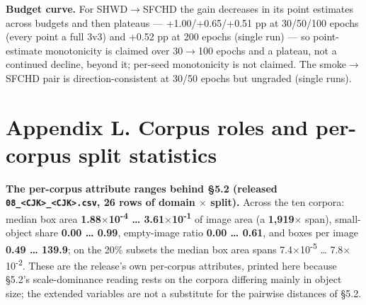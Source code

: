 \documentclass[pdflatex,sn-mathphys-ay]{sn-jnl}
\begin{document}
\textbf{Budget curve.} For SHWD\ensuremath{\rightarrow}SFCHD the gain decreases in its point estimates across budgets and then plateaus --- +1.00/+0.65/+0.51 pp at 30/50/100 epochs (every point a full 3v3) and +0.52 pp at 200 epochs (single run) --- so point-estimate monotonicity is claimed over 30\ensuremath{\rightarrow}100 epochs and a plateau, not a continued decline, beyond it; per-seed monotonicity is not claimed. The smoke\ensuremath{\rightarrow}SFCHD pair is direction-consistent at 30/50 epochs but ungraded (single runs).

\section*{Appendix L. Corpus roles and per-corpus split statistics}

\textbf{The per-corpus attribute ranges behind \S{}5.2 (released \texttt{08\_<CJK>\_<CJK>.csv}, 26 rows of domain \ensuremath{\times} split).} Across the ten corpora: median box area \textbf{1.88\ensuremath{\times}10\textsuperscript{-4} \ldots{} 3.61\ensuremath{\times}10\textsuperscript{-1}} of image area (a \textbf{1,919\ensuremath{\times}} span), small-object share \textbf{0.00 \ldots{} 0.99}, empty-image ratio \textbf{0.00 \ldots{} 0.61}, and boxes per image \textbf{0.49 \ldots{} 139.9}; on the 20\% subsets the median box area spans 7.4\ensuremath{\times}10\textsuperscript{-5} \ldots{} 7.8\ensuremath{\times}10\textsuperscript{-2}. These are the release's own per-corpus attributes, printed here because \S{}5.2's scale-dominance reading rests on the corpora differing mainly in object size; the extended variables are not a substitute for the pairwise distances of \S{}5.2.
\end{document}
